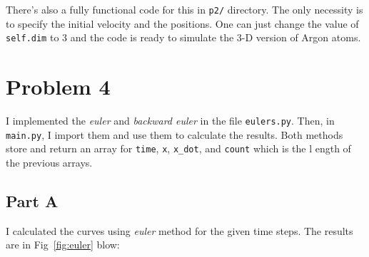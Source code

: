 \documentclass[12pt, a4paper]{article}
\begin{document}
	There's also a fully functional code for this in \texttt{p2/} directory. The only necessity is to specify the initial velocity and the positions. One can 
	just change the value of \texttt{self.dim} to $3$ and the code is ready to simulate the 3-D version of Argon atoms.

	\section{Problem 4}
	I implemented the \emph{euler} and \emph{backward euler} in the file \texttt{eulers.py}. Then, in \texttt{main.py}, I import them and use them
	to calculate the results. Both methods store and return an array for \texttt{time}, \texttt{x}, \texttt{x\_dot}, and \texttt{count} which is the l
	ength of the previous arrays. 
	
	\subsection{Part A}
	I calculated the curves using \emph{euler} method for the given time steps. The results are in Fig~\ref{fig:euler} blow:
	
\end{document}
